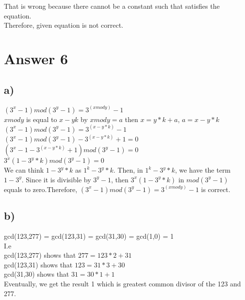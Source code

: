 \documentclass[12pt]{article}
\begin{document}
That is wrong because there cannot be a constant such that satisfies the equation. \\ 
Therefore, given equation is not correct.


\section*{Answer 6}
\subsection*{a)}

$(3^x - 1)mod(3^y - 1)  = 3^(x mod y) - 1$ \\

$x mod y $ is equal to $x - yk$ by $x mod y = a$ then $x = y*k+a$, $a = x -y*k$ \\

$(3^x - 1)mod(3^y - 1)  = 3^(x - y*k) - 1$ \\ 

$(3^x - 1)mod(3^y - 1) - 3^(x - y* k) + 1 = 0$ \\

$(3^x - 1 - 3^(x - y* k) + 1)mod(3^y - 1) = 0$ \\

$3^x(1 - 3^y*k) mod (3^y - 1) = 0$ \\


We can think $1 - 3^y*k$ as $1^k - 3^y*k$. Then, in $1^k - 3^y*k$, we have the term $1-3^y$. Since it is divisible by $3^y - 1$, then $3^x(1 - 3^y*k)$ in $mod (3^y - 1)$ equals to zero.Therefore, $(3^x - 1)mod(3^y - 1)  = 3^(x mod y) - 1$ is correct.
 



\subsection*{b)}

gcd(123,277) = gcd(123,31) = gcd(31,30) = gcd(1,0) = 1 \\

I.e \\


gcd(123,277) shows that \quad $277  = 123 * 2 + 31 $ \\
gcd(123,31) shows that \quad $123  = 31* 3 + 30$ \\
gcd(31,30) shows that  \quad $31  = 30* 1 + 1$ \\

Eventually, we get the result 1 which is greatest common divisor of the 123 and 277.
\end{document}
